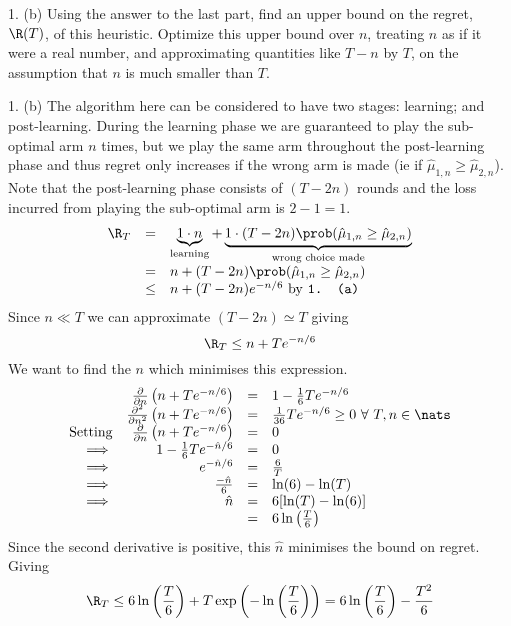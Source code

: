\documentclass[11pt,a4paper]{article}
\begin{document}
\begin{question}{1. (b)}
  Using the answer to the last part, find an upper bound on the regret, $\R(T)$, of this heuristic. Optimize this upper bound over $n$, treating $n$ as if it were a real number, and approximating quantities like $T-n$ by $T$, on the assumption that $n$ is much smaller than $T$.
\end{question}

\begin{answer}{1. (b)}
  The algorithm here can be considered to have two stages: learning; and post-learning. During the learning phase we are guaranteed to play the sub-optimal arm $n$ times, but we play the same arm throughout the post-learning phase and thus regret only increases if the wrong arm is made (ie if $\hat\mu_{1,n}\geq\hat\mu_{2,n}$).\\
  Note that the post-learning phase consists of $(T-2n)$ rounds and the loss incurred from playing the sub-optimal arm is $2-1=1$.
  \[\begin{array}{rcl}
    \R_T&=&\underbrace{1\cdot n}_\text{learning}+\underbrace{1\cdot(T-2n)\prob(\hat\mu_{1,n}\geq\hat\mu_{2,n})}_\text{wrong choice made}\\
    &=&n+(T-2n)\prob(\hat\mu_{1,n}\geq\hat\mu_{2,n})\\
    &\leq&n+(T-2n)e^{-n/6}\text{ by \texttt{1. (a)}}
  \end{array}\]
  Since $n\ll T$ we can approximate $(T-2n)\simeq T$ giving
  \[ \R_T\leq n+Te^{-n/6} \]
  We want to find the $n$ which minimises this expression.
  \[\begin{array}{rrcl}
    &\frac{\partial }{\partial n}\left(n+Te^{-n/6}\right)&=&1-\frac16Te^{-n/6}\\
    &\frac{\partial^2 }{\partial n^2}\left(n+Te^{-n/6}\right)&=&\frac1{36}Te^{-n/6}\geq0\ \forall\ T,n\in\nats\\
    \text{Setting}&\frac{\partial }{\partial n}\left(n+Te^{-n/6}\right)&=&0\\
    \implies&1-\frac16Te^{-\hat{n}/6}&=&0\\
    \implies&e^{-\hat{n}/6}&=&\frac6T\\
    \implies&\frac{-\hat{n}}6&=&\ln(6)-\ln(T)\\
    \implies&\hat{n}&=&6[\ln(T)-\ln(6)]\\
    &&=&6\ln\left(\frac{T}6\right)
  \end{array}\]
  Since the second derivative is positive, this $\hat{n}$ minimises the bound on regret. Giving
  \[ \R_T\leq6\ln\left(\frac{T}6\right)+T\exp\left(-\ln\left(\frac{T}6\right)\right)=6\ln\left(\frac{T}6\right)-\frac{T^2}6 \]
\end{answer}
\end{document}
